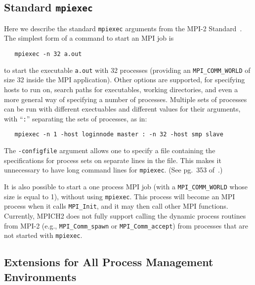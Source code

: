 \documentclass[dvipdfm,11pt]{article}
\begin{document}
\subsection{Standard \texttt{mpiexec}}
\label{sec:mpiexec-standard}

Here we describe the standard \texttt{mpiexec} arguments from the MPI-2
Standard~\cite{mpi-forum:mpi2-journal}.  The simplest form of a command
to start an MPI job is 
\begin{verbatim}
   mpiexec -n 32 a.out
\end{verbatim}
to start the executable \texttt{a.out} with 32 processes (providing an
\texttt{MPI\_COMM\_WORLD} of size 32 inside the MPI application).  Other
options are supported, for specifying hosts to run on,  search paths for
executables, working directories, and even a more general way of
specifying a number of processes.  Multiple sets of processes can be run
with different exectuables and different values for their arguments,
with ``\texttt{:}'' separating the sets of processes, as in:
\begin{verbatim}
   mpiexec -n 1 -host loginnode master : -n 32 -host smp slave
\end{verbatim}
The \texttt{-configfile} argument allows one to specify a file containing the
specifications for process sets on separate lines in the file.  This
makes it unnecessary to have long command lines for \texttt{mpiexec}.  
(See pg.~353 of~\cite{Snir:1998:MPI2Book}.)

It is also possible to start a one process MPI job (with a
\texttt{MPI\_COMM\_WORLD} whose size is equal to 1), without using
\texttt{mpiexec}. 
This process will become an MPI process when it calls \texttt{MPI\_Init}, and
it may then call other MPI functions.  
Currently, MPICH2 does not fully support calling the dynamic process routines
from MPI-2 (e.g., \texttt{MPI\_Comm\_spawn} or \texttt{MPI\_Comm\_accept})
from processes that are not started with \texttt{mpiexec}.  

\subsection{Extensions for All Process Management Environments}
\label{sec:extensions-uniform}
\end{document}
